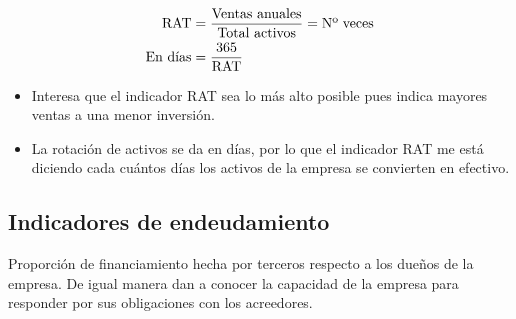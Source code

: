 \documentclass{templateNote}
\begin{document}
\begin{itemize}
    \begin{align*}
        \textnormal{RAT} &= \frac{\textnormal{Ventas anuales}}{\textnormal{Total activos}} = \textnormal{Nº veces} \\
        \textnormal{En días} &= \frac{365}{\textnormal{RAT}}
    \end{align*} 
    \begin{itemize}
        \item Interesa que el indicador RAT sea lo más alto posible pues indica mayores ventas a una menor inversión.
        \item La rotación de activos se da en días, por lo que el indicador RAT me está diciendo cada cuántos días los activos de la empresa se convierten en efectivo.
    \end{itemize}\end{itemize}

\subsection{Indicadores de endeudamiento}
\noindent Proporción de financiamiento hecha por terceros respecto a los dueños de la empresa. De igual manera dan a conocer la capacidad de la empresa para responder por 
sus obligaciones con los acreedores.
\end{document}
